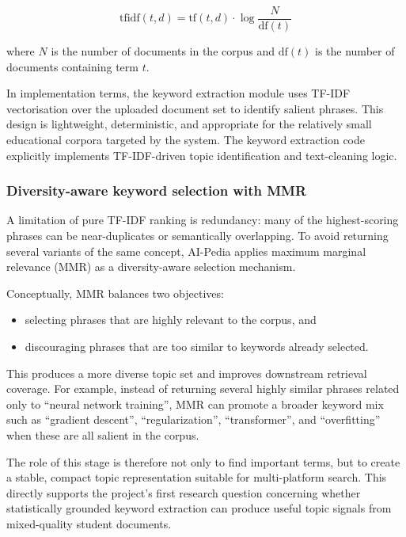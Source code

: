 \documentclass[10pt,journal,compsoc]{IEEEtran}
\begin{document}
\begin{equation}
\mathrm{tfidf}(t,d)=\mathrm{tf}(t,d)\cdot \log\frac{N}{\mathrm{df}(t)}
\end{equation}

where $N$ is the number of documents in the corpus and $\mathrm{df}(t)$ is the number of documents containing term $t$.

In implementation terms, the keyword extraction module uses TF-IDF vectorisation over the uploaded document set to identify salient phrases. This design is lightweight, deterministic, and appropriate for the relatively small educational corpora targeted by the system. The keyword extraction code explicitly implements TF-IDF-driven topic identification and text-cleaning logic.

\subsubsection{Diversity-aware keyword selection with MMR}

A limitation of pure TF-IDF ranking is redundancy: many of the highest-scoring phrases can be near-duplicates or semantically overlapping. To avoid returning several variants of the same concept, AI-Pedia applies maximum marginal relevance (MMR) as a diversity-aware selection mechanism.

Conceptually, MMR balances two objectives:
\begin{itemize}
\item selecting phrases that are highly relevant to the corpus, and
\item discouraging phrases that are too similar to keywords already selected.
\end{itemize}

This produces a more diverse topic set and improves downstream retrieval coverage. For example, instead of returning several highly similar phrases related only to ``neural network training'', MMR can promote a broader keyword mix such as ``gradient descent'', ``regularization'', ``transformer'', and ``overfitting'' when these are all salient in the corpus.

The role of this stage is therefore not only to find important terms, but to create a stable, compact topic representation suitable for multi-platform search. This directly supports the project's first research question concerning whether statistically grounded keyword extraction can produce useful topic signals from mixed-quality student documents.
\end{document}
